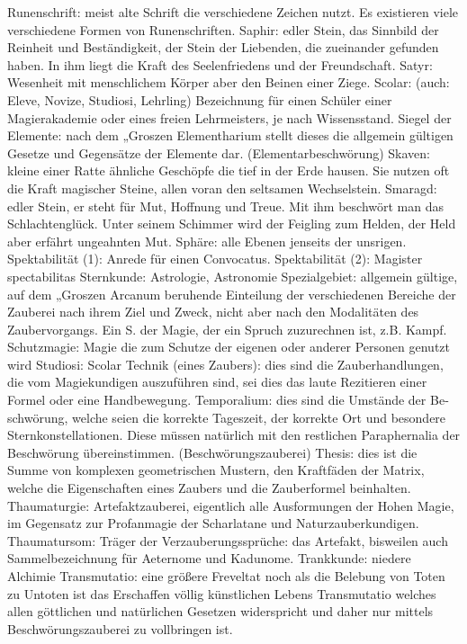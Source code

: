 \documentclass[a5paper,8pt]{book}
\begin{document}
Runenschrift: meist alte Schrift die verschiedene Zeichen nutzt. Es existieren viele verschiedene Formen von Runenschriften.
Saphir: edler Stein, das Sinnbild der Rein­heit und Beständigkeit, der Stein der Liebenden, die zueinander gefunden haben. In ihm liegt die Kraft des Seelenfriedens und der Freundschaft.
Satyr: Wesenheit mit menschlichem Körper aber den Beinen einer Ziege.
Scolar: (auch: Eleve, Novize, Studiosi, Lehrling) Bezeichnung für einen Schüler einer Magierakademie oder eines freien Lehr­meisters, je nach Wissensstand. 
Siegel der Elemente: nach dem „\textit{}Groszen Elemen­tharium stellt dieses die allgemein gültigen Gesetze und Gegensätze der Elemente dar. (\textit{}Elementarbeschwörung)
Skaven: kleine einer Ratte ähnliche Geschöpfe die tief in der Erde hausen. Sie nutzen oft die Kraft magischer Steine, allen voran den seltsamen \textit{}Wechselstein. 
Smaragd: edler Stein, er steht für Mut, Hoffnung und Treue. Mit ihm beschwört man das Schlachtenglück. Unter seinem Schimmer wird der Feigling zum Helden, der Held aber erfährt ungeahnten Mut.
Sphäre: alle Ebenen jenseits der unsrigen.
Spektabilität (1): Anrede für einen \textit{}Convocatus.
Spektabilität (2): \textit{}Magister spectabilitas
Sternkunde: \textit{}Astrologie,\textit{} Astronomie
Spezialgebiet: allgemein gültige, auf dem „Groszen Arcanum beruhende Einteilung der verschiedenen Bereiche der Zauberei nach ihrem Ziel und Zweck, nicht aber nach den Modalitäten des Zaubervorgangs. Ein S. der Magie, der ein Spruch zuzurechnen ist, z.B. Kampf.
Schutzmagie: Magie die zum Schutze der eigenen oder anderer Personen genutzt wird
Studiosi: \textit{}Scolar
Technik (eines Zaubers): dies sind die Zauber­hand­lungen, die vom Magiekundigen auszuführen sind, sei dies das laute Rezitieren einer Formel oder eine Hand­bewegung.
Temporalium: dies sind die Umstände der Be­schwörung, welche seien die korrekte Tageszeit, der kor­rekte Ort und besondere Sternkonstellationen. Diese müs­sen natürlich mit den restlichen \textit{}Para­phernalia der Be­schwörung übereinstimmen. (\textit{}Beschwörungs­zauberei)
Thesis: dies ist die Summe von komplexen geo­metrischen Mustern, den Kraftfäden der \textit{}Matrix, welche die Eigenschaften eines Zaubers und die Zauberformel beinhalten.
Thaumaturgie: Artefaktzauberei, eigentlich alle Aus­formungen der Hohen Magie, im Gegensatz zur Profan­magie der Scharlatane und Naturzauberkundigen.
Thaumatursom: Träger der Verzauberungssprüche: das Artefakt, bisweilen auch Sammelbezeichnung für \textit{}Aeternome und \textit{}Kadunome.
Trankkunde: \textit{}niedere Alchimie
Transmutatio: eine größere Freveltat noch als die Be­lebung von Toten zu Untoten ist das Erschaffen völlig künstlichen Lebens Transmutatio welches allen gött­lichen und natürlichen Gesetzen widerspricht und daher nur mittels \textit{}Beschwörungszauberei zu voll­bringen ist.
\end{document}
